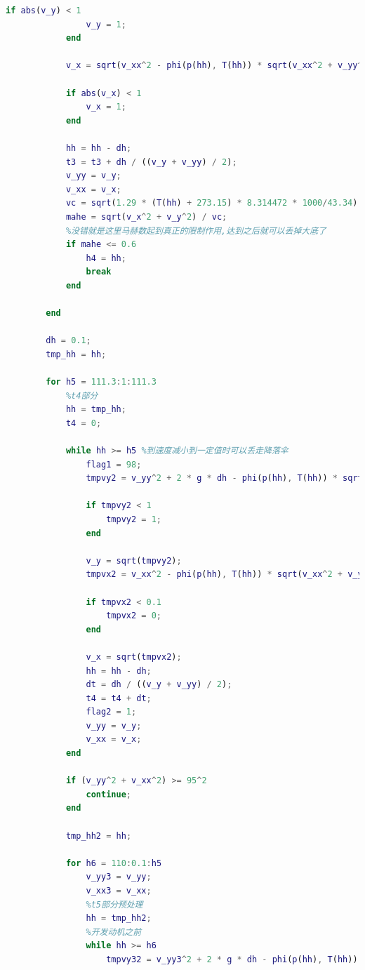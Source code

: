 \documentclass[hyperref,a4paper,UTF8]{ctexart}
\begin{document}
\begin{lstlisting}[language=Matlab]
            if abs(v_y) < 1
                v_y = 1;
            end

            v_x = sqrt(v_xx^2 - phi(p(hh), T(hh)) * sqrt(v_xx^2 + v_yy^2) * (S_floor + S_para) * dh * v_xx^2 / (m * v_yy));

            if abs(v_x) < 1
                v_x = 1;
            end

            hh = hh - dh;
            t3 = t3 + dh / ((v_y + v_yy) / 2);
            v_yy = v_y;
            v_xx = v_x;
            vc = sqrt(1.29 * (T(hh) + 273.15) * 8.314472 * 1000/43.34);
            mahe = sqrt(v_x^2 + v_y^2) / vc;
            %没错就是这里马赫数起到真正的限制作用,达到之后就可以丢掉大底了
            if mahe <= 0.6
                h4 = hh;
                break
            end

        end

        dh = 0.1;
        tmp_hh = hh;

        for h5 = 111.3:1:111.3
            %t4部分
            hh = tmp_hh;
            t4 = 0;

            while hh >= h5 %到速度减小到一定值时可以丢走降落伞
                flag1 = 98;
                tmpvy2 = v_yy^2 + 2 * g * dh - phi(p(hh), T(hh)) * sqrt(v_yy^2 + v_xx^2) * (S_floor + S_para) * dh * v_yy / (m - m_floor);

                if tmpvy2 < 1
                    tmpvy2 = 1;
                end

                v_y = sqrt(tmpvy2);
                tmpvx2 = v_xx^2 - phi(p(hh), T(hh)) * sqrt(v_xx^2 + v_yy^2) * (S_floor + S_para) * dh * v_xx^2 / ((m - m_floor) * v_yy);

                if tmpvx2 < 0.1
                    tmpvx2 = 0;
                end

                v_x = sqrt(tmpvx2);
                hh = hh - dh;
                dt = dh / ((v_y + v_yy) / 2);
                t4 = t4 + dt;
                flag2 = 1;
                v_yy = v_y;
                v_xx = v_x;
            end

            if (v_yy^2 + v_xx^2) >= 95^2
                continue;
            end

            tmp_hh2 = hh;

            for h6 = 110:0.1:h5
                v_yy3 = v_yy;
                v_xx3 = v_xx;
                %t5部分预处理
                hh = tmp_hh2;
                %开发动机之前
                while hh >= h6
                    tmpvy32 = v_yy3^2 + 2 * g * dh - phi(p(hh), T(hh)) * sqrt(v_yy3^2 + v_xx3^2) * (S_floor + S_para) * dh * v_yy3 / (m - m_floor - m_para - m_hide);


\end{lstlisting}
\end{document}
